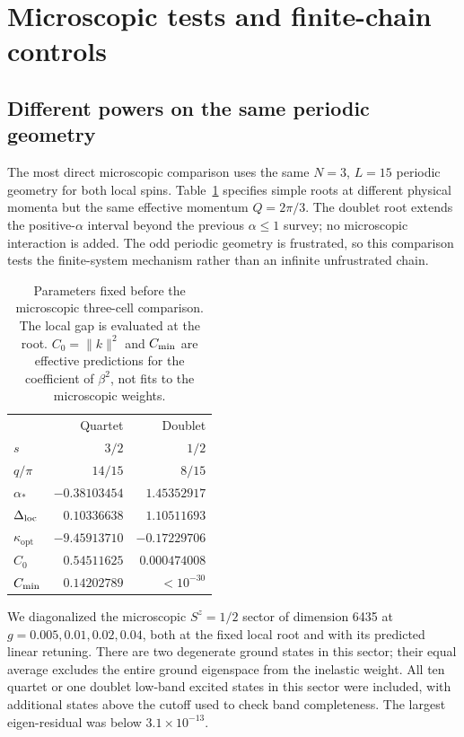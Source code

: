 \section{Microscopic tests and finite-chain controls}
\label{app:ground-controls}

\subsection{Different powers on the same periodic geometry}

The most direct microscopic comparison uses the same $N=3$, $L=15$ periodic
geometry for both local spins. Table~\ref{tab:rank-roots} specifies simple
roots at different physical momenta but the same effective momentum
$Q=2\pi/3$. The doublet root extends the positive-$\alpha$ interval beyond
the previous $\alpha\le1$ survey; no microscopic interaction is added.
The odd periodic geometry is frustrated, so this comparison tests the
finite-system mechanism rather than an infinite unfrustrated chain.

\begin{table}[t]
\caption{Parameters fixed before the microscopic three-cell comparison.
The local gap is evaluated at the root. $C_0=\|k\|^2$ and $C_{\mathrm{min}}$ are
effective predictions for the coefficient of $\beta^2$, not fits to the
microscopic weights.}
\label{tab:rank-roots}
\begin{ruledtabular}
\begin{tabular}{lrr}
 & Quartet & Doublet\\
$s$ & $3/2$ & $1/2$\\
$q/\pi$ & $14/15$ & $8/15$\\
$\alpha_*$ & $-0.38103454$ & $1.45352917$\\
$\Delta_{\mathrm{loc}}$ & $0.10336638$ & $1.10511693$\\
$\kappa_{\mathrm{opt}}$ & $-9.45913710$ & $-0.17229706$\\
$C_0$ & $0.54511625$ & $0.000474008$\\
$C_{\mathrm{min}}$ & $0.14202789$ & $<10^{-30}$\\
\end{tabular}
\end{ruledtabular}
\end{table}

We diagonalized the microscopic $S^z=1/2$ sector of dimension 6435 at
$g=0.005,0.01,0.02,0.04$, both at the fixed local root and with its
predicted linear retuning. There are two degenerate ground states in this
sector; their equal average excludes the entire ground eigenspace from the
inelastic weight. All ten quartet or one doublet low-band excited states
in this sector were included, with additional states above the cutoff used
to check band completeness. The largest eigen-residual was below
$3.1\times10^{-13}$.

